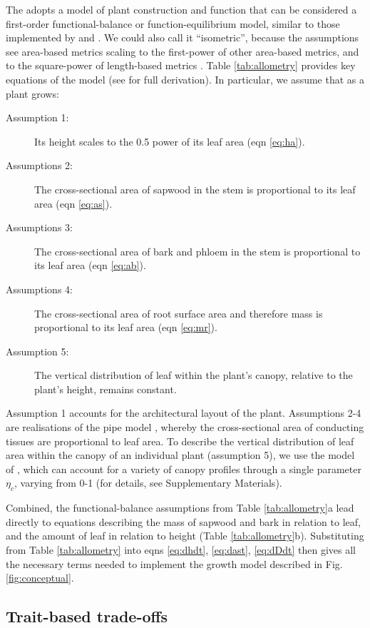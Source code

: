 \documentclass[a4paper,11pt]{article}
\begin{document}
The {\plant} adopts a model of plant construction and function that can be considered a first-order functional-balance or function-equilibrium model, similar to those implemented by \citet{Makela-1997} and \citet{Moorcroft-2001}. We could also call it ``isometric'', because the assumptions see area-based metrics scaling to the first-power of other area-based metrics, and to the square-power of length-based metrics \citep{Huxley-1932}. Table \ref{tab:allometry} provides key equations of the model (see \citealt{Falster-2016} for full derivation). In particular, we assume that as a plant grows:
\begin{description}
\item[Assumption 1:] Its height scales to the 0.5 power of its leaf area (eqn \ref{eq:ha}).
\item[Assumptions 2:] The cross-sectional area of sapwood in the stem is proportional to its leaf area (eqn \ref{eq:as}).
\item[Assumptions 3:] The cross-sectional area of bark and phloem in the stem  is proportional to its leaf area (eqn \ref{eq:ab}).
\item[Assumptions 4:] The cross-sectional area of root surface area and therefore mass is proportional to its leaf area (eqn \ref{eq:mr}).
\item[Assumption 5:] The vertical distribution of leaf within the plant's canopy, relative to the plant's height, remains constant.
\end{description}
Assumption 1 accounts for the architectural layout of the plant. Assumptions 2-4 are realisations of the pipe model \citep{Shinozaki-1964}, whereby the cross-sectional area of conducting tissues are proportional to leaf area. To describe the vertical distribution of leaf area within the canopy of an individual plant (assumption 5), we use the model of \citet{Yokozawa-1995}, which can account for a variety of canopy profiles through a single parameter $\eta_c$, varying from 0-1 (for details, see Supplementary Materials).

Combined, the functional-balance assumptions from Table \ref{tab:allometry}a lead directly to equations describing the mass of sapwood and bark in relation to leaf, and the amount of leaf in relation to height (Table \ref{tab:allometry}b). Substituting from Table \ref{tab:allometry} into eqns \ref{eq:dhdt}, \ref{eq:dast}, \ref{eq:dDdt} then gives all the necessary terms needed to implement the growth model described in Fig. \ref{fig:conceptual}.

\subsection{Trait-based trade-offs}
\end{document}
